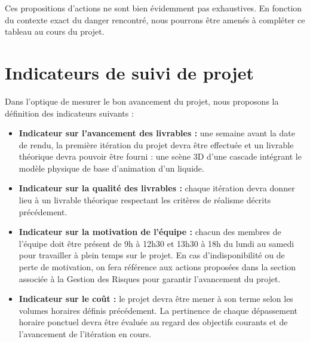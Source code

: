 \documentclass[a4paper,11pt]{article}
\begin{document}
Ces propositions d'actions ne sont bien évidemment pas exhaustives. En fonction du contexte exact du danger rencontré, nous pourrons être amenés à compléter ce tableau au cours du projet.

\section{Indicateurs de suivi de projet}

Dans l'optique de mesurer le bon avancement du projet, nous proposons la définition des indicateurs suivants :
\begin{itemize}
\item \textbf{Indicateur sur l'avancement des livrables : } une semaine avant la date de rendu, la première itération du projet devra être effectuée et un livrable théorique devra pouvoir être fourni : une scène 3D d'une cascade intégrant le modèle physique de base d'animation d'un liquide. 
\item \textbf{Indicateur sur la qualité des livrables : } chaque itération devra donner lieu à un livrable théorique respectant les critères de réalisme décrits précédement.
\item \textbf{Indicateur sur la motivation de l'équipe : } chacun des membres de l'équipe doit être présent de 9h à 12h30 et 13h30 à 18h du lundi au samedi pour travailler à plein temps sur le projet. En cas d'indisponibilité ou de perte de motivation, on fera référence aux actions proposées dans la section associée à la Gestion des Risques pour garantir l'avancement du projet.
\item \textbf{Indicateur sur le coût : } le projet devra être mener à son terme selon les volumes horaires définis précédement. La pertinence de chaque dépassement horaire ponctuel devra être évaluée au regard des objectifs courants et de l'avancement de l'itération en cours.

\end{itemize}
\end{document}
